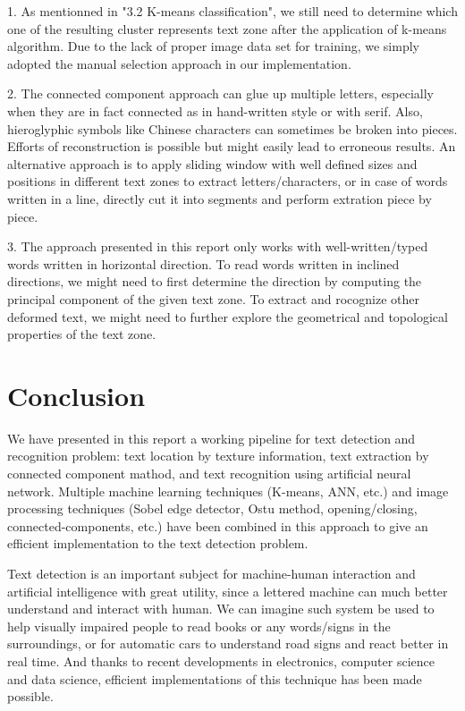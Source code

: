 \documentclass[paper=a4, french, 11pt]{scrartcl}
\begin{document}
1. As mentionned in "3.2 K-means classification", we still need to determine which one of the resulting cluster represents text zone after the application of k-means algorithm. Due to the lack of proper image data set for training, we simply adopted the manual selection approach in our implementation.

2. The connected component approach can glue up multiple letters, especially when they are in fact connected as in hand-written style or with serif. Also, hieroglyphic symbols like Chinese characters can sometimes be broken into pieces. Efforts of reconstruction is possible but might easily lead to erroneous results. An alternative approach is to apply sliding window with well defined sizes and positions in different text zones to extract letters/characters, or in case of words written in a line, directly cut it into segments and perform extration piece by piece.

3. The approach presented in this report only works with well-written/typed words written in horizontal direction. To read words written in inclined directions, we might need to first determine the direction by computing the principal component of the given text zone. To extract and rocognize other deformed text, we might need to further explore the geometrical and topological properties of the text zone.

\section{Conclusion} \mbox{} \vspace{-0.5cm}

We have presented in this report a working pipeline for text detection and recognition problem: text location by texture information, text extraction by connected component mathod, and text recognition using artificial neural network. Multiple machine learning techniques (K-means, ANN, etc.) and image processing techniques (Sobel edge detector, Ostu method, opening/closing, connected-components, etc.) have been combined in this approach to give an efficient implementation to the text detection problem.  

Text detection is an important subject for machine-human interaction and artificial intelligence with great utility, since a lettered machine can much better understand and interact with human. We can imagine such system be used to help visually impaired people to read books or any words/signs in the surroundings, or for automatic cars to understand road signs and react better in real time. And thanks to recent developments in electronics, computer science and data science, efficient implementations of this technique has been made possible.  



\end{document}
